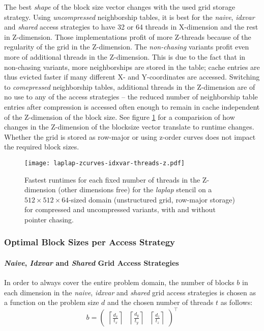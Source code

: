 The best \emph{shape} of the block size vector changes with the used grid storage strategy. Using \emph{uncompressed} neighborship tables, it is best for the \emph{naive}, \emph{idxvar} and \emph{shared} access strategies to have 32 or 64 threads in X-dimension and the rest in Z-dimension. Those implementations profit of more Z-threads because of the regularity of the grid in the Z-dimension. The \emph{non-chasing} variants profit even more of additional threads in the Z-dimension. This is due to the fact that in non-chasing variants, more neighborships are stored in the table; cache entries are thus evicted faster if many different X- and Y-coordinates are accessed. Switching to \emph{comepressed} neighborship tables, additional threads in the Z-dimension are of no use to any of the access strategies -- the reduced number of neighborship table entries after compression is accessed often enough to remain in cache independent of the Z-dimension of the block size. See figure \ref{fig:blocksizes-z} for a comparision of how changes in the Z-dimension of the blocksize vector translate to runtime changes. Whether the grid is stored as row-major or using z-order curves does not impact the required block sizes.

\begin{figure}
	\texttt{[image: laplap-zcurves-idxvar-threads-z.pdf]} %
	\caption{\label{fig:blocksizes-z}Fastest runtimes for each fixed number of threads in the Z-dimension (other dimensions free) for the \emph{laplap} stencil on a $512\times 512\times 64$-sized domain (unstructured grid, row-major storage) for compressed and uncompressed variants, with and without pointer chasing.}
\end{figure}

\subsubsection{Optimal Block Sizes per Access Strategy}

\paragraph{\emph{Naive}, \emph{Idxvar} and \emph{Shared} Grid Access Strategies}
In order to always cover the entire problem domain, the number of blocks $b$ in each dimension in the \emph{naive}, \emph{idxvar} and \emph{shared} grid access strategies is chosen as a function on the problem size $d$ and the chosen number of threads $t$ as follows:
$$b = \begin{pmatrix}\left\lceil\frac{d_x}{t_x}\right\rceil & \left\lceil\frac{d_y}{t_y}\right\rceil & \left\lceil\frac{d_z}{t_z}\right\rceil\end{pmatrix}^\top$$

